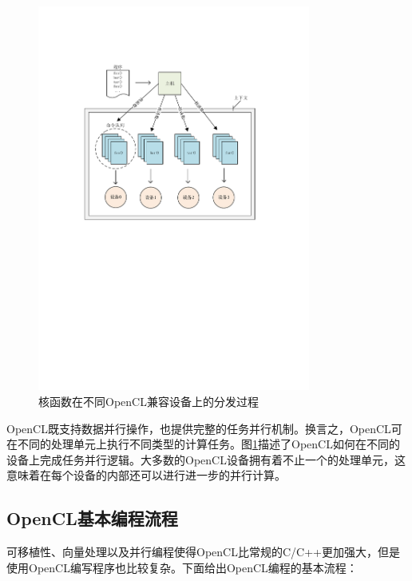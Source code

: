 \begin{figure}[htbp]
    \begin{center}
    \includegraphics[width=0.8\textwidth, height=0.68\textwidth]{figures/opencl.pdf}
    \end{center}
    \caption{核函数在不同OpenCL兼容设备上的分发过程}\label{figure:figure7}
\end{figure}

OpenCL既支持数据并行操作，也提供完整的任务并行机制。换言之，OpenCL可在不同的处理单元上执行不同类型的计算任务。图\ref{figure:figure7}描述了OpenCL如何在不同的设备上完成任务并行逻辑。大多数的OpenCL设备拥有着不止一个的处理单元，这意味着在每个设备的内部还可以进行进一步的并行计算。

\subsection{OpenCL基本编程流程}

可移植性、向量处理以及并行编程使得OpenCL比常规的C/C++更加强大，但是使用OpenCL编写程序也比较复杂。下面给出OpenCL编程的基本流程：

